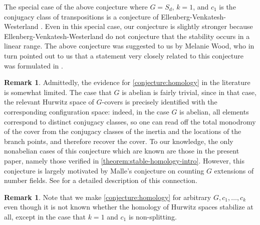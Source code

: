 \documentclass[12 pt]{amsart}
\theoremstyle{plain}
\theoremstyle{definition}
\newtheorem{remark}[theorem]{Remark}
\theoremstyle{remark}
\numberwithin{equation}{section}
\begin{document}
The special case of the above conjecture where $G = S_d$, $k = 1$, and $c_1$ is the 
conjugacy class of transpositions is a conjecture of
Ellenberg-Venkatesh-Westerland \cite[Conjecture
1.5]{EllenbergVW:cohenLenstra}.
Even in this special case, our conjecture is slightly stronger because
Ellenberg-Venkatesh-Westerland do not conjecture that the stability
occurs in a linear range.
The above conjecture was suggested to us by Melanie Wood, who in turn pointed
out to us that a statement very closely related to this conjecture was formulated in
\cite[Corollary 5.8]{ellenbergVWhomologicalII}.

\begin{remark}
	\label{remark:}
	Admittedly, the evidence for \autoref{conjecture:homology} in the literature is somewhat limited.
The case that $G$ is abelian is fairly trivial, since in that case, the relevant
Hurwitz space of
$G$-covers is precisely identified with the corresponding configuration space:
indeed, in the case $G$ is abelian, all elements correspond to distinct conjugacy
classes, so one can read off the total monodromy of the cover from the conjugacy
classes of the inertia and the locations of the branch points, and therefore recover the cover.
To our knowledge, the only nonabelian cases of this conjecture which are known
are those in the present paper, namely those verified in
\autoref{theorem:stable-homology-intro}.
However, this conjecture is largely motivated by Malle's conjecture on counting
$G$ extensions of number fields.
See \cite{ellenbergV:statistics-of-number-fields-and-function-fields} for a
detailed description of this connection.
\end{remark}


\begin{remark}
	\label{remark:}
	Note that we make \autoref{conjecture:homology} for arbitrary $G,c_1,
	\ldots, c_k$
	even though it is not
known whether the homology of Hurwitz spaces stabilize at all, except in the
case that $k = 1$ and $c_1$
is non-splitting.
\end{remark}
\end{document}
